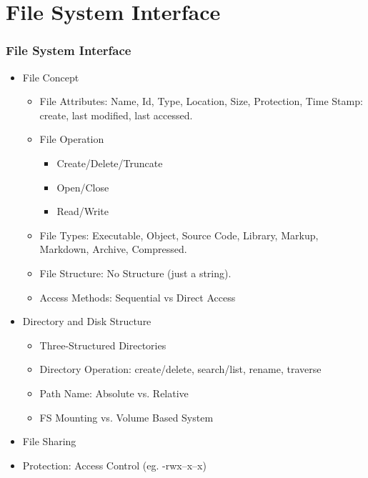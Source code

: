 \documentclass[xcolor=table, notheorems, hyperref={pdfpagelabels=false}]{beamer}
\begin{document}
\section{File System Interface}
\begin{frame}[fragile]
\frametitle{File System Interface}
\begin{itemize}
\item File Concept
\begin{itemize}
\item File Attributes: Name, Id, Type, Location, Size, Protection, Time Stamp: create, last modified, last accessed.
\item File Operation
\begin{itemize}
\item Create/Delete/Truncate
\item Open/Close
\item Read/Write
\end{itemize}
\item File Types: Executable, Object, Source Code, Library, Markup, Markdown, Archive, Compressed.
\item File Structure: No Structure (just a string).
\item Access Methods: Sequential vs Direct Access
\end{itemize}
\item Directory and Disk Structure
\begin{itemize}
\item Three-Structured Directories
\item Directory Operation: create/delete, search/list, rename, traverse
\item Path Name: Absolute vs. Relative
\item FS Mounting vs. Volume Based System
\end{itemize}
\item File Sharing
\item Protection: Access Control (eg. -rwx--x--x)
\end{itemize}
\end{frame}

\end{document}
